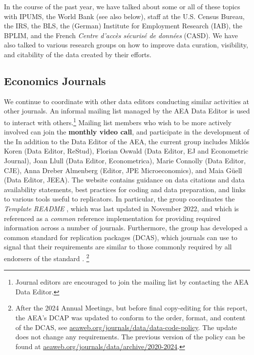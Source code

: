 In the course of the past year, we have talked about some or all of these topics with IPUMS, the World Bank (see also below), staff at the U.S. Census Bureau, the \ac{IRS}, the \ac{BLS}, the (German) Institute for Employment Research (IAB),  the \ac{BPLIM},  and the French \textit{Centre d'accès sécurisé de données} (CASD). We have also talked to various research groups on how to improve data curation, visibility, and citability of the data created by their efforts. 

\subsection{Economics Journals}

We continue to coordinate with other data editors conducting similar activities at other journals. An informal mailing list managed by the AEA Data Editor is used to interact with others.\footnote{Journal editors are encouraged to join the mailing list by contacting the AEA Data Editor.} Mailing list members who wish to be more actively involved can join the \textbf{monthly video call}, and participate in the development of the  In addition to the Data Editor of the AEA, the current group includes Miklós Koren (Data Editor, \acl{ReStud}), Florian Oswald (Data Editor, \acl{EJ} and Econometric Journal), Joan Llull (Data Editor, Econometrica),  Marie Connolly (Data Editor, \acl{CJE}), Anna Dreber Almenberg (Editor, JPE Microeconomics), and Maia G\"uell (Data Editor, \acl{JEEA}).  The website contains guidance on data citations and data availability statements, best practices for coding and data preparation, and links to various tools useful to replicators. In particular, the group coordinates the \textit{Template README} \citep{READMEv1.1.0}, which was last updated in November 2022, and which is referenced as a \textit{common} reference implementation for providing required information  across a number of journals. Furthermore, the group has developed a common standard for replication packages (\ac{DCAS}), which journals can use to signal that their requirements are similar to those commonly required by all endorsers of the standard \citep{datacodestandardv1}.%
\footnote{
After the 2024 Annual Meetings, but before final copy-editing for this report, the AEA's \acf{DCAP} was updated to conform to the order, format, and content of the \ac{DCAS}, see \href{https://www.aeaweb.org/journals/data/data-code-policy}{aeaweb.org/journals/data/data-code-policy}. The update does not change any requirements. The previous version of the policy can be found at \href{https://www.aeaweb.org/journals/data/archive/2020-2024}{aeaweb.org/journals/data/archive/2020-2024}. } 
